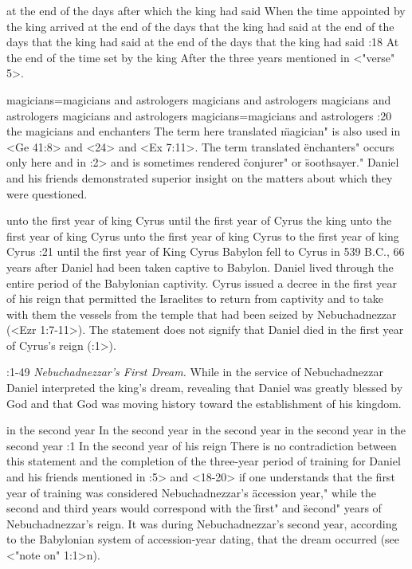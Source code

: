     {at the end of the days after which the king had said} %
    {When the time appointed by the king arrived} %
    {at the end of the days that the king had said} %
    {at the end of the days that the king had said} %
    {at the end of the days that the king had said} %
:18 {At the end of the time set by the king} After the three years mentioned in <"verse" 5>.



    {magicians}={magicians and astrologers} %
    {magicians and astrologers} %
    {magicians and astrologers} %
    {magicians and astrologers} %
    {magicians}={magicians and astrologers} %
:20 {the magicians and enchanters} The term here translated \"magician" is also used in
<Ge 41:8> and <24> and <Ex 7:11>. The term translated \"enchanters" occurs only here and in :2> and is
sometimes rendered \"conjurer" or \"soothsayer." Daniel and his friends demonstrated superior insight
on the matters about which they were questioned.

    {unto the first year of king Cyrus} %
    {until the first year of Cyrus the king} %
    {unto the first year of king Cyrus} %
    {unto the first year of king Cyrus} %
    {to the first year of king Cyrus} %
:21 {until the first year of King Cyrus} Babylon
fell to Cyrus in 539 B.C., 66 years after Daniel had been taken captive to Babylon. Daniel lived
through the entire period of the Babylonian captivity. Cyrus issued a decree in the first year of
his reign that permitted the Israelites to return from captivity and to take with them the vessels
from the temple that had been seized by Nebuchadnezzar (<Ezr 1:7-11>). The statement does not signify
that Daniel died in the first year of Cyrus's reign (:1>).

:1-49 {} {\it Nebuchadnezzar's First Dream.\/} While in the service of Nebuchadnezzar Daniel interpreted the
king's dream, revealing that Daniel was greatly blessed by God and that God was moving  
history toward the establishment of his kingdom.

    {in the second year} %
    {In the second year} %
    {in the second year} %
    {in the second year} %
    {in the second year} %
:1 {In the second year of his reign} There is no contradiction 
between this statement and the completion of the three-year period of training for Daniel and his
friends mentioned in :5> and  <18-20> if one understands that the first year of training was
considered Nebuchadnezzar's \"accession year," while the second and  
third years would correspond with the \"first" and \"second" years 
of Nebuchadnezzar's reign. It was during Nebuchadnezzar's second year, according to the Babylonian
system of accession-year  dating, that the dream occurred (see <"note on" 1:1>n).

